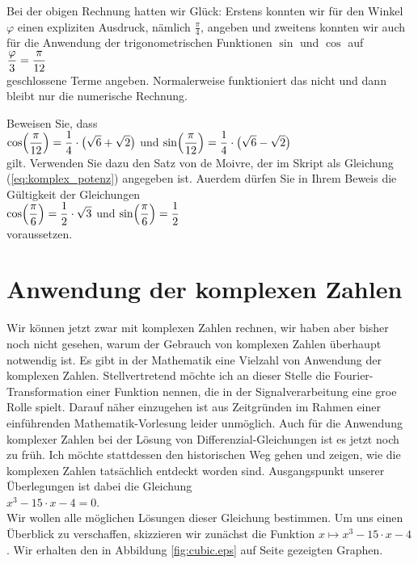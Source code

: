 \remark
Bei der obigen Rechnung hatten wir Gl\"{u}ck:  Erstens konnten wir f\"{u}r den Winkel $\varphi$ einen expliziten
Ausdruck, n\"{a}mlich $\frac{\pi}{4}$, angeben und zweitens konnten wir auch f\"ur die Anwendung der trigonometrischen
Funktionen $\sin$ und $\cos$ auf
\\[0.2cm]
\hspace*{1.3cm}
$\displaystyle\frac{\varphi}{3} = \frac{\pi}{12}$ 
\\[0.2cm]
geschlossene Terme angeben.  Normalerweise
funktioniert das nicht und dann bleibt nur die numerische Rechnung. 

\exercise
Beweisen Sie, dass 
\\[0.2cm]
\hspace*{1.3cm}
$\displaystyle\cos\Bigl(\frac{\pi}{12}\Bigr) = \frac{1}{4} \cdot \bigl(\sqrt{6} + \sqrt{2}\bigr)$ \quad und \quad
$\displaystyle\sin\Bigl(\frac{\pi}{12}\Bigr) = \frac{1}{4} \cdot \bigl(\sqrt{6} - \sqrt{2}\bigr)$
\\[0.2cm]
gilt.  Verwenden Sie dazu den Satz von de Moivre, der im Skript als Gleichung
(\ref{eq:komplex_potenz}) angegeben ist. 
Au\3erdem d\"{u}rfen Sie in Ihrem Beweis die G\"{u}ltigkeit der Gleichungen
\\[0.2cm]
\hspace*{1.3cm}
$\displaystyle\cos\Bigl(\frac{\pi}{6}\Bigr) = \frac{1}{2}\cdot\sqrt{3}$ \quad und \quad $\displaystyle\sin\Bigl(\frac{\pi}{6}\Bigr) = \frac{1}{2}$
\\[0.2cm]
voraussetzen.
\exend

\section{Anwendung der komplexen Zahlen}
Wir k\"{o}nnen jetzt zwar mit komplexen Zahlen rechnen, wir haben aber bisher noch nicht gesehen, warum der 
Gebrauch von komplexen Zahlen \"{u}berhaupt notwendig ist.  Es gibt in der Mathematik eine Vielzahl von
Anwendung der komplexen Zahlen.  Stellvertretend m\"{o}chte ich an dieser Stelle die Fourier-Transformation
einer Funktion nennen, die in der Signalverarbeitung eine gro\3e Rolle spielt.  Darauf n\"{a}her einzugehen
ist aus Zeitgr\"{u}nden im Rahmen einer einf\"{u}hrenden Mathematik-Vorlesung leider unm\"{o}glich.  Auch f\"{u}r die
Anwendung komplexer Zahlen bei der L\"{o}sung von Differenzial-Gleichungen ist es jetzt noch zu fr\"{u}h.  Ich
m\"{o}chte stattdessen den historischen Weg gehen und zeigen, wie die komplexen Zahlen tats\"{a}chlich entdeckt
worden sind.  Ausgangspunkt unserer \"{U}berlegungen ist dabei die Gleichung
\\[0.2cm]
\hspace*{1.3cm}
$x^3 - 15 \cdot x - 4 = 0$.
\\[0.2cm]
Wir wollen alle m\"{o}glichen L\"{o}sungen dieser Gleichung bestimmen.  Um uns einen \"{U}berblick zu verschaffen,
skizzieren wir zun\"{a}chst die Funktion $x \mapsto x^3 - 15 \cdot x - 4$.  Wir erhalten den in Abbildung
\ref{fig:cubic.eps} auf Seite \pageref{fig:cubic.eps} gezeigten Graphen.

